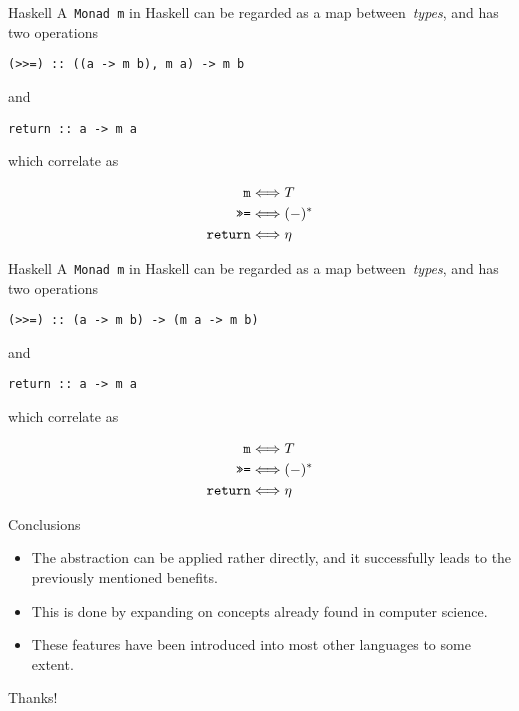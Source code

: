 \documentclass[notes]{beamer}
\begin{document}
\begin{frame}[fragile]{Haskell}
    A~\texttt{Monad m} in Haskell can be regarded as a map
    between~\emph{types}, and has two operations
    \begin{verbatim}
(>>=) :: ((a -> m b), m a) -> m b
    \end{verbatim}
    and
    \begin{verbatim}
return :: a -> m a
    \end{verbatim}
    which correlate as

    \begin{align*}
        \text{\texttt{m}} &\Longleftrightarrow T \\
        \text{\texttt{>>=}} &\Longleftrightarrow (-)^{\ast} \\
        \text{\texttt{return}} &\Longleftrightarrow \eta
    \end{align*}
\end{frame}

\begin{frame}[fragile]{Haskell}
    A~\texttt{Monad m} in Haskell can be regarded as a map
    between~\emph{types}, and has two operations
    \begin{verbatim}
(>>=) :: (a -> m b) -> (m a -> m b)
    \end{verbatim}
    and
    \begin{verbatim}
return :: a -> m a
    \end{verbatim}
    which correlate as

    \begin{align*}
        \text{\texttt{m}} &\Longleftrightarrow T \\
        \text{\texttt{>>=}} &\Longleftrightarrow (-)^{\ast} \\
        \text{\texttt{return}} &\Longleftrightarrow \eta
    \end{align*}
\end{frame}

\begin{frame}{Conclusions}
    \begin{itemize}
        \item The abstraction can be applied rather directly, and it
            successfully leads to the previously mentioned benefits.

            \pause

        \item This is done by expanding on concepts already found in computer
            science.

            \pause

        \item These features have been introduced into most other languages to
            some extent.
    \end{itemize}
\end{frame}

\begin{frame}
    \begin{center}
        \Huge Thanks!
    \end{center}
\end{frame}
\end{document}

